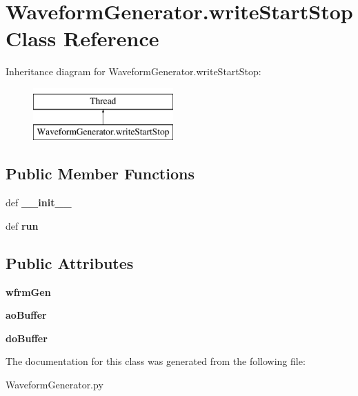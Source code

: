 \hypertarget{class_waveform_generator_1_1write_start_stop}{\section{Waveform\-Generator.\-write\-Start\-Stop Class Reference}
\label{class_waveform_generator_1_1write_start_stop}
}
Inheritance diagram for Waveform\-Generator.\-write\-Start\-Stop\-:\begin{figure}[H]
\begin{center}
\leavevmode
\includegraphics[height=2.000000cm]{class_waveform_generator_1_1write_start_stop}
\end{center}
\end{figure}
\subsection*{Public Member Functions}
\begin{DoxyCompactItemize}
\item 
\hypertarget{class_waveform_generator_1_1write_start_stop_a84166d000212aed31411326b1f6ad7d3}{def {\bfseries \-\_\-\-\_\-init\-\_\-\-\_\-}}\label{class_waveform_generator_1_1write_start_stop_a84166d000212aed31411326b1f6ad7d3}

\item 
\hypertarget{class_waveform_generator_1_1write_start_stop_a0f9b7017ea13e84b1a9cb4fa151c5338}{def {\bfseries run}}\label{class_waveform_generator_1_1write_start_stop_a0f9b7017ea13e84b1a9cb4fa151c5338}

\end{DoxyCompactItemize}
\subsection*{Public Attributes}
\begin{DoxyCompactItemize}
\item 
\hypertarget{class_waveform_generator_1_1write_start_stop_af78d279a83c3909fa46bb6e4a435a5dc}{{\bfseries wfrm\-Gen}}\label{class_waveform_generator_1_1write_start_stop_af78d279a83c3909fa46bb6e4a435a5dc}

\item 
\hypertarget{class_waveform_generator_1_1write_start_stop_ad2f062e57c3abe1f02d6be4622c684c9}{{\bfseries ao\-Buffer}}\label{class_waveform_generator_1_1write_start_stop_ad2f062e57c3abe1f02d6be4622c684c9}

\item 
\hypertarget{class_waveform_generator_1_1write_start_stop_af692989b770b7d2c40682994f296fdae}{{\bfseries do\-Buffer}}\label{class_waveform_generator_1_1write_start_stop_af692989b770b7d2c40682994f296fdae}

\end{DoxyCompactItemize}


The documentation for this class was generated from the following file\-:\begin{DoxyCompactItemize}
\item 
Waveform\-Generator.\-py\end{DoxyCompactItemize}
